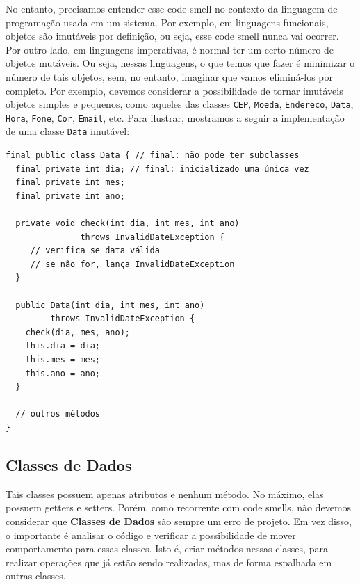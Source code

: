 \documentclass[
  11pt,
  twoside]{book}
\newcommand{\passthrough}[1]{#1}
\begin{document}
No entanto, precisamos entender esse code smell no contexto da linguagem
de programação usada em um sistema. Por exemplo, em linguagens
funcionais, objetos são imutáveis por definição, ou seja, esse code
smell nunca vai ocorrer. Por outro lado, em linguagens imperativas, é
normal ter um certo número de objetos mutáveis. Ou seja, nessas
linguagens, o que temos que fazer é minimizar o número de tais objetos,
sem, no entanto, imaginar que vamos eliminá-los por completo. Por
exemplo, devemos considerar a possibilidade de tornar imutáveis objetos
simples e pequenos, como aqueles das classes
\passthrough{\lstinline!CEP!}, \passthrough{\lstinline!Moeda!},
\passthrough{\lstinline!Endereco!}, \passthrough{\lstinline!Data!},
\passthrough{\lstinline!Hora!}, \passthrough{\lstinline!Fone!},
\passthrough{\lstinline!Cor!}, \passthrough{\lstinline!Email!}, etc.
Para ilustrar, mostramos a seguir a implementação de uma classe
\passthrough{\lstinline!Data!} imutável:

\begin{lstlisting}
final public class Data { // final: não pode ter subclasses
  final private int dia; // final: inicializado uma única vez
  final private int mes;
  final private int ano;
   
  private void check(int dia, int mes, int ano) 
               throws InvalidDateException {
     // verifica se data válida
     // se não for, lança InvalidDateException
  } 
   
  public Data(int dia, int mes, int ano) 
         throws InvalidDateException {
    check(dia, mes, ano);
    this.dia = dia;
    this.mes = mes;
    this.ano = ano;
  }
   
  // outros métodos
}
\end{lstlisting}

\hypertarget{classes-de-dados}{%
\subsection{Classes de Dados}\label{classes-de-dados}}


Tais classes possuem apenas atributos e nenhum método. No máximo, elas
possuem getters e setters. Porém, como recorrente com code smells, não
devemos considerar que \textbf{Classes de Dados} são sempre um erro de
projeto. Em vez disso, o importante é analisar o código e verificar a
possibilidade de mover comportamento para essas classes. Isto é, criar
métodos nessas classes, para realizar operações que já estão sendo
realizadas, mas de forma espalhada em outras classes.
\end{document}
